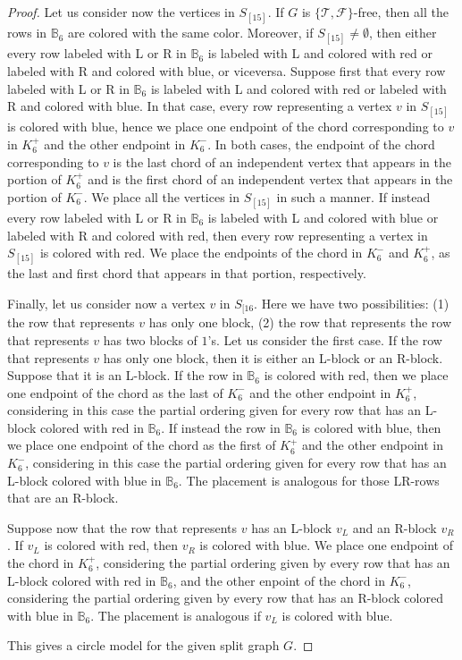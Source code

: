 \documentclass[12pt]{book}
\theoremstyle{plain}
\newcounter{cases}
\theoremstyle{remark}
\begin{document}
\begin{proof}
Let us consider now the vertices in $S_{[15]}$. If $G$ is $\{ \mathcal{T}, \mathcal{F} \}$-free, then all the rows in $\mathbb B_6$ are colored with the same color. Moreover, if $S_{[15]} \neq \emptyset$, then either every row labeled with L or R in $\mathbb B_6$ is labeled with L and colored with red or labeled with R and colored with blue, or viceversa. 
Suppose first that every row labeled with L or R in $\mathbb B_6$ is labeled with L and colored with red or labeled with R and colored with blue. In that case, every row representing a vertex $v$ in $S_{[15]}$ is colored with blue, hence we place one endpoint of the chord corresponding to $v$ in $K_6^+$ and the other endpoint in $K_6^-$. In both cases, the endpoint of the chord corresponding to $v$ is the last chord of an independent vertex that appears in the portion of $K_6^+$ and is the first chord of an independent vertex that appears in the portion of $K_6^-$. We place all the vertices in $S_{[15]}$ in such a manner.
If instead every row labeled with L or R in $\mathbb B_6$ is labeled with L and colored with blue or labeled with R and colored with red, then every row representing a vertex in $S_{[15]}$ is colored with red. We place the endpoints of the chord in $K_6^-$ and $K_6^+$, as the last and first chord that appears in that portion, respectively.

Finally, let us consider now a vertex $v$ in $S_{[16}$. Here we have two possibilities: (1) the row that represents $v$ has only one block, (2) the row that represents the row that represents $v$ has two blocks of $1$'s.
Let us consider the first case. If the row that represents $v$ has only one block, then it is either an L-block or an R-block. Suppose that it is an L-block. If the row in $\mathbb B_6$ is colored with red, then we place one endpoint of the chord as the last of $K_6^-$ and the other endpoint in $K_6^+$, considering in this case the partial ordering given for every row that has an L-block colored with red in $\mathbb B_6$. 
If instead the row in $\mathbb B_6$ is colored with blue, then we place one endpoint of the chord as the first of $K_6^+$ and the other endpoint in $K_6^-$, considering in this case the partial ordering given for every row that has an L-block colored with blue in $\mathbb B_6$. The placement is analogous for those LR-rows that are an R-block.

Suppose now that the row that represents $v$ has an L-block $v_L$ and an R-block $v_R$. If $v_L$ is colored with red, then $v_R$ is colored with blue. We place one endpoint of the chord in $K_6^+$, considering the partial ordering given by every row that has an L-block colored with red in $\mathbb B_6$, and the other enpoint of the chord in $K_6^-$, considering the partial ordering given by every row that has an R-block colored with blue in $\mathbb B_6$. The placement is analogous if $v_L$ is colored with blue.


This gives a circle model for the given split graph $G$.


\end{proof}
\end{document}
